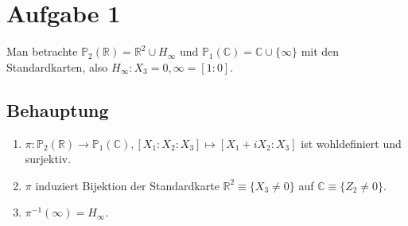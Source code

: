 \documentclass[11pt]{article}
\begin{document}
\section*{Aufgabe 1}
Man betrachte $ \mathbb{P}_2(\mathbb{R}) = \mathbb{R}^2 \cup H_\infty $ und $ \mathbb{P}_1(\mathbb{C}) = \mathbb{C} \cup \lbrace \infty \rbrace $ mit den Standardkarten, also $ H_\infty : X_3 = 0, \infty = \left[1:0\right] $.
\subsection*{Behauptung}
\begin{enumerate}
	\item $ \pi: \mathbb{P}_2(\mathbb{R}) \to \mathbb{P}_1(\mathbb{C}), \left[X_1:X_2:X_3\right] \mapsto \left[X_1 + iX_2 : X_3\right] $ ist wohldefiniert und surjektiv.
	\item $ \pi $ induziert Bijektion der Standardkarte $ \mathbb{R}^2 \equiv \lbrace X_3 \neq 0 \rbrace $ auf $ \mathbb{C} \equiv \lbrace Z_2 \neq 0 \rbrace $.
	\item $ \pi^{-1}(\infty) = H_\infty $.
\end{enumerate}
\end{document}
